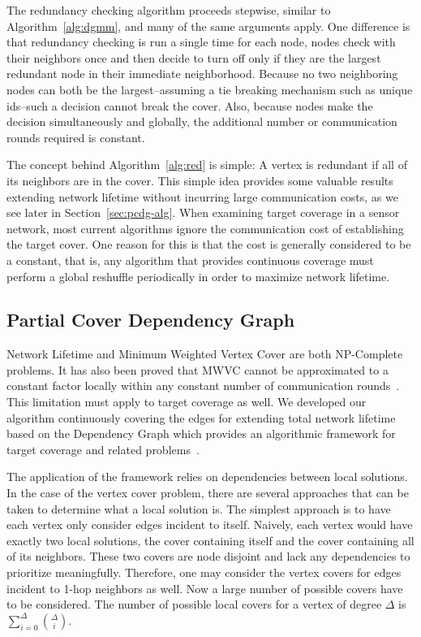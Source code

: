  



The redundancy checking algorithm proceeds stepwise, similar to Algorithm~\ref{alg:dgmm}, and many of the same arguments apply. One difference is that redundancy checking is run a single time for each node, nodes check with their neighbors once and then decide to turn off only if they are the largest redundant node in their immediate neighborhood. Because no two neighboring nodes can both be the largest--assuming a tie breaking mechanism such as unique ids--such a decision cannot break the cover. Also, because nodes make the decision simultaneously and globally, the additional number or communication rounds required is constant.

The concept behind Algorithm~\ref{alg:red} is simple: A vertex is redundant if all of its neighbors are in the cover. This simple idea provides some valuable results extending network lifetime without incurring large communication costs, as we see later in Section~\ref{sec:pcdg-alg}. When examining target coverage in a sensor network, most current algorithms ignore the communication cost of establishing the target cover\cite{1514028}. One reason for this is that the cost is generally considered to be a constant, that is, any algorithm that provides continuous coverage must perform a global reshuffle periodically in order to maximize network lifetime. 

\subsection{Partial Cover Dependency Graph}
\label{sec:life-depend}
Network Lifetime and Minimum Weighted Vertex Cover are both NP-Complete problems. It has also been proved that MWVC cannot be approximated to a constant factor locally within any constant number of communication rounds~\cite{1011811}. This limitation must apply to target coverage as well. We developed our algorithm continuously covering the edges for extending total network lifetime based on the Dependency Graph which provides an algorithmic framework for target coverage and related problems~\cite{IPDPS.2008.45361}. 

The application of the framework relies on dependencies between local solutions. In the case of the vertex cover problem, there are several approaches that can be taken to determine what a local solution is. The simplest approach is to have each vertex only consider edges incident to itself. Naively, each vertex would have exactly two local solutions, the cover containing itself and the cover containing all of its neighbors. These two covers are node disjoint and lack any dependencies to prioritize meaningfully.   Therefore, one may consider the vertex covers for edges incident to 1-hop neighbors as well. Now a large number of possible covers have to be considered. The number of possible local covers for a vertex of degree $\Delta$ is $\sum_{i=0}^\Delta \binom{\Delta}{i}$. 

